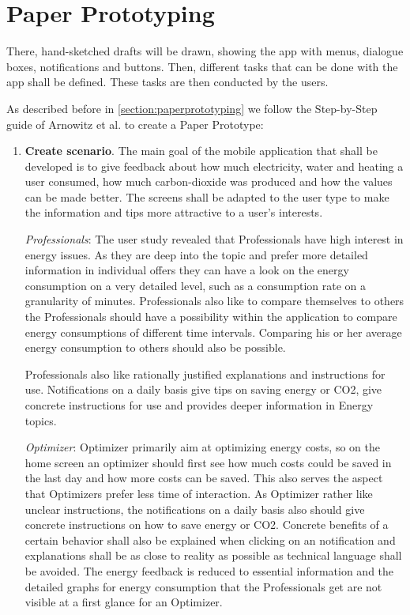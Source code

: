\section{Paper Prototyping}
There, hand-sketched drafts will be drawn, showing the app with menus, dialogue boxes, notifications and buttons. Then, different tasks that can be done with the app shall be defined. These tasks are then conducted by the users.

As described before in \ref{section:paperprototyping} we follow the Step-by-Step guide of Arnowitz et al. \cite{arnowitz2010effective} to create a Paper Prototype:


\begin{enumerate}
	\item \textbf{Create scenario}. The main goal of the mobile application that shall be developed is to give feedback about how much electricity, water and heating a user consumed, how much carbon-dioxide was produced and how the values can be made better. The screens shall be adapted to the user type to make the information and tips more attractive to a user's interests.
	
	\textit{Professionals}:
	The user study revealed that Professionals have high interest in energy issues. As they are deep into the topic and prefer more detailed information in individual offers they can have a look on the energy consumption on a very detailed level, such as a consumption rate on a granularity of minutes. Professionals also like to compare themselves to others the Professionals should have a possibility within the application to compare energy consumptions of different time intervals. Comparing his or her average energy consumption to others should also be possible.
	
	Professionals also like rationally justified explanations and instructions for use. Notifications on a daily basis give tips on saving energy or CO2, give concrete instructions for use and provides deeper information in Energy topics.

	
	\textit{Optimizer}:
	Optimizer primarily aim at optimizing energy costs, so on the home screen an optimizer should first see how much costs could be saved in the last day and how more costs can be saved. This also serves the aspect that Optimizers prefer less time of interaction. As Optimizer rather like unclear instructions, the notifications on a daily basis also should give concrete instructions on how to save energy or CO2. Concrete benefits of a certain behavior shall also be explained when clicking on an notification and explanations shall be as close to reality as possible as technical language shall be avoided. The energy feedback is reduced to essential information and the detailed graphs for energy consumption that the Professionals get are not visible at a first glance for an Optimizer. 
	

\end{enumerate}
